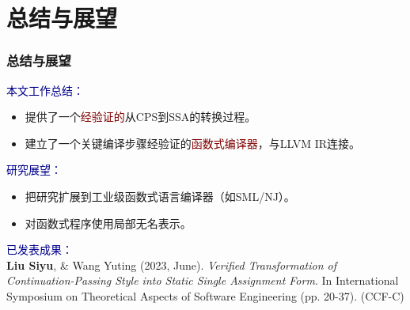 
\section{总结与展望}

\begin{frame}
  \frametitle{总结与展望}
  \textcolor{DarkBlue}{本文工作总结：}
  \begin{itemize}
      \item 提供了一个\textcolor{Maroon}{经验证的}从CPS到SSA的转换过程。
      \item 建立了一个关键编译步骤经验证的\textcolor{Maroon}{函数式编译器}，与LLVM IR连接。
  \end{itemize}
  \vspace{1ex}
  \textcolor{DarkBlue}{研究展望：}
  \begin{itemize}
    \item 把研究扩展到工业级函数式语言编译器（如SML/NJ）。
    \item 对函数式程序使用局部无名表示。
  \end{itemize}
  \vspace{1ex}
  \textcolor{DarkBlue}{已发表成果：} \\
  \footnotesize
  \textbf{Liu Siyu}, \& Wang Yuting (2023, June). \textit{Verified Transformation of Continuation-Passing 
  Style into Static Single Assignment Form}. In International Symposium on 
  Theoretical Aspects of Software Engineering (pp. 20-37). (CCF-C)
  \end{frame}

